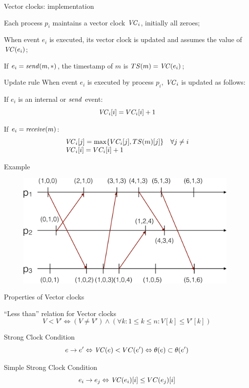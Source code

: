 \begin{frame}{Vector clocks: implementation}
\BI
\item Each process $p_i$ maintains a vector clock $\mathit{VC}_i$, initially all zeroes;
\item When event $e_i$ is executed, its vector clock is updated and assumes the value of $\mathit{VC}(e_i)$;
\item If $e_i = \mathit{send}(m,*)$, the timestamp of $m$ is $TS(m) = \mathit{VC}(e_i)$;
\EI

\bigskip
\begin{block}{Update rule}
When event $e_i$ is executed by process $p_i$, $\mathit{VC}_i$ is updated as follows:
\BI
  \item If $e_i$ is an internal or $\mathit{send}$ event: 
\[
  \mathit{VC}_i[i] = VC_i[i] + 1
\]
  \item If $e_i = \mathit{receive}(m)$: \\
\[
  \begin{array}{ll}
    \mathit{VC}_i[j] = \max \{ VC_i[j], TS(m)[j] \}  & \forall j \neq i \\
    \mathit{VC}_i[i] = VC_i[i] + 1
  \end{array} 
\]
\EI
\end{block}
\end{frame}

\begin{frame}{Example}
\begin{figure} 
\includegraphics[width=11cm]{figs/03/diagram5}
\end{figure}
\end{frame}

\begin{frame}{Properties of Vector clocks}

\begin{block}{``Less than'' relation for Vector clocks}
\[
  V < V' \Leftrightarrow (V \neq V') \wedge (\forall k: 1 \leq k \leq n: V[k] \leq V'[k])
\]
\end{block}

\begin{block}{Strong Clock Condition}
\[
  e \rightarrow e' \Leftrightarrow \mathit{VC}(e) < VC(e') \Leftrightarrow \theta(e) \subset \theta(e')
\]
\end{block}

\begin{block}{Simple Strong Clock Condition}
\[
  e_i \rightarrow e_j \Leftrightarrow \mathit{VC}(e_i)[i] \leq VC(e_j)[i]
\]
\end{block}

\end{frame}



